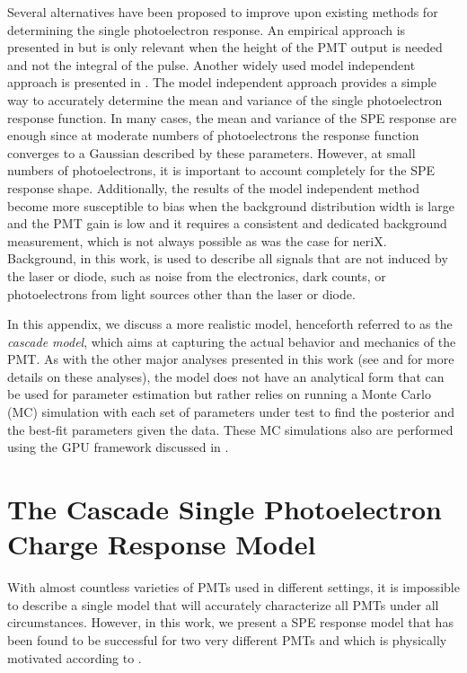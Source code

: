 Several alternatives have been proposed to improve upon existing methods for determining the single photoelectron response.  An empirical approach is presented in  but is only relevant when the height of the PMT output is needed and not the integral of the pulse.  Another widely used model independent approach is presented in .  The model independent approach provides a simple way to accurately determine the mean and variance of the single photoelectron response function.  In many cases, the mean and variance of the SPE response are  enough since at moderate numbers of photoelectrons the response function converges to a Gaussian described by these parameters.  However, at small numbers of photoelectrons, it is important to account completely for the SPE response shape.  Additionally, the results of the model independent method become more susceptible to bias when the background distribution width is large and the PMT gain is low and it requires a consistent and dedicated background measurement, which is not always possible as was the case for neriX.  Background, in this work, is used to describe all signals that are not induced by the laser or diode, such as noise from the electronics, dark counts, or photoelectrons from light sources other than the laser or diode.

In this appendix, we discuss a more realistic model, henceforth referred to as the \textit{cascade model}, which aims at capturing the actual behavior and mechanics of the PMT.  As with the other major analyses presented in this work (see  and  for more details on these analyses), the model does not have an analytical form that can be used for parameter estimation but rather relies on running a Monte Carlo (MC) simulation with each set of parameters under test to find the posterior and the best-fit parameters given the data.  These MC simulations also are performed using the GPU framework discussed in .


\section{The Cascade Single Photoelectron Charge Response Model}
\label{sec:pmt_cascade_description}

With almost countless varieties of PMTs used in different settings, it is impossible to describe a single model that will accurately characterize all PMTs under all circumstances.  However, in this work, we present a SPE response model that has been found to be successful for two very different PMTs and which is physically motivated according to .  

